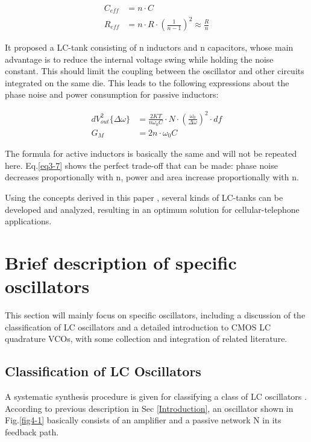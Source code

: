 \documentclass[conference]{IEEEtran}
\begin{document}
\begin{equation}
\begin{aligned}
C_{eff} &= n\cdot C \\
R_{eff} &= n\cdot R\cdot (\frac{1}{n-1})^2 \approx\frac{R}{n}
\end{aligned}
\label{eq3-8}
\end{equation}

It proposed a LC-tank consisting of n inductors and n capacitors, whose main advantage is to reduce the internal voltage swing while holding the noise constant. This should limit the coupling between the oscillator and other circuits integrated on the same die. This leads to the following expressions about the phase noise and power consumption for passive inductors:

\begin{equation}
\begin{aligned}
dV_{out}^2\{\Delta \omega\} &= \frac{2KT}{n\omega_0C}\cdot N\cdot (\frac{\omega_0}{\Delta\omega})^2\cdot df \\
G_M &= 2n\cdot \omega_0 C
\end{aligned}
\label{eq3-7}
\end{equation}

The formula for active inductors is basically the same and will not be repeated here. Eq.\ref{eq3-7} shows the perfect trade-off that can be made: phase noise decreases proportionally with n, power and area increase proportionally with n. 

Using the concepts derived in this paper \cite{b6}, several kinds of LC-tanks can be developed and analyzed, resulting in an optimum solution for cellular-telephone applications.

\section{Brief description of specific oscillators}\label{sec4}
This section will mainly focus on specific oscillators, including a discussion of the classification of LC oscillators and a detailed introduction to CMOS LC quadrature VCOs, with some collection and integration of related literature.

\subsection{Classification of LC Oscillators}

A systematic synthesis procedure is given for classifying a class of LC oscillators \cite{b7}. According to previous description in Sec \ref{Introduction}, an oscillator shown in Fig.\ref{fig4-1} basically consists of an amplifier and a passive network N in its feedback path.
\end{document}
